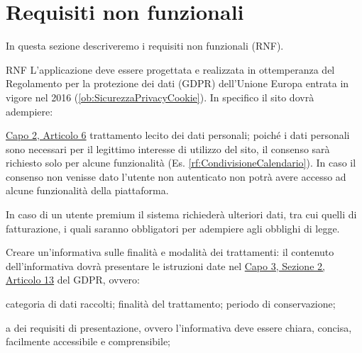 \section{Requisiti non funzionali}
\label{secD1:RequisitiNonFunzionali}

In questa sezione descriveremo i requisiti non funzionali (RNF).

\begin{listaPersonale}{RNF}
     L'applicazione deve essere progettata e realizzata in ottemperanza del Regolamento per la protezione dei dati (GDPR) dell'Unione Europa entrata in vigore nel 2016 (\ref{ob:SicurezzaPrivacyCookie}). In specifico il sito dovrà adempiere:
    \begin{listaPersonale2}[RNF]{}
         \href{https://eur-lex.europa.eu/legal-content/IT/TXT/?uri=uriserv:OJ.L_.2016.119.01.0001.01.ITA&toc=OJ:L:2016:119:TOC#d1e1898-1-1}{Capo 2, Articolo 6} trattamento lecito dei dati personali; poiché i dati personali sono necessari per il legittimo interesse di utilizzo del sito, il consenso sarà richiesto solo per alcune funzionalità (Es. \ref{rf:CondivisioneCalendario}). In caso il consenso non venisse dato l'utente non autenticato non potrà avere accesso ad alcune funzionalità della piattaforma.
        \begin{listaPersonale3}[RNF]{}
             In caso di un utente premium il sistema richiederà ulteriori dati, tra cui quelli di fatturazione, i quali saranno obbligatori per adempiere agli obblighi di legge.
        \end{listaPersonale3}

         Creare un'informativa sulle finalità e modalità dei trattamenti: il contenuto dell'informativa dovrà presentare le istruzioni date nel \href{https://eur-lex.europa.eu/legal-content/IT/TXT/?uri=uriserv:OJ.L_.2016.119.01.0001.01.ITA&toc=OJ:L:2016:119:TOC#d1e2261-1-1}{Capo 3, Sezione 2, Articolo 13} del GDPR, ovvero:
        \begin{listaPersonale3}[RNF]{}
             categoria di dati raccolti;
             finalità del trattamento;
             periodo di conservazione;
        \end{listaPersonale3}

         a dei requisiti di presentazione, ovvero l'informativa deve essere chiara, concisa, facilmente accessibile e comprensibile;


\end{listaPersonale2}
\end{listaPersonale}
